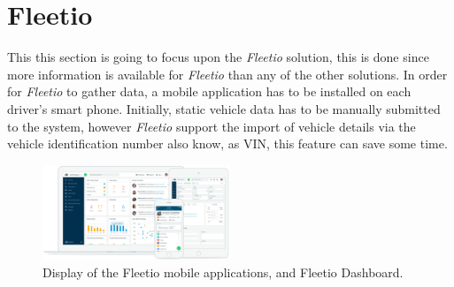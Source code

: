 \section{Fleetio}
This this section is going to focus upon the \textit{Fleetio} solution, this is done since more information is available for \textit{Fleetio} than any of the other solutions.
In order for \textit{Fleetio} to gather data, a mobile application has to be installed on each driver's smart phone.
Initially, static vehicle data has to be manually submitted to the system, however \textit{Fleetio} support the import of vehicle details via the vehicle identification number also know, as VIN, this feature can save some time.

\begin{figure}[h!]
    \centering
    \includegraphics[width=0.5\textwidth]{img/fleetio.png}
    \caption{Display of the Fleetio mobile applications, and Fleetio Dashboard.}
    \label{fig:Fleetio_Devices}
\end{figure}

